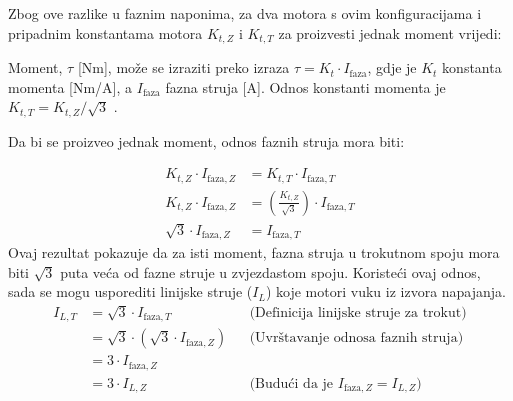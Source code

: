 \documentclass[diplomskirad]{fer}
\begin{document}
Zbog ove razlike u faznim naponima, za dva motora s ovim konfiguracijama i
pripadnim konstantama motora $K_{t, Z}$ i $K_{t, T}$ za proizvesti jednak
moment vrijedi:

Moment, $\tau$ [Nm], može se izraziti preko izraza $\tau = K_t \cdot
	I_{\text{faza}}$, gdje je $K_t$ konstanta momenta [Nm/A], a $I_{\text{faza}}$
fazna struja [A]. Odnos konstanti momenta je $K_{t, T} = K_{t, Z} / \sqrt{3}$
\cite{cite:disertacija}.

Da bi se proizveo jednak moment, odnos faznih struja mora biti:

\begin{align*}
	K_{t,Z} \cdot I_{\text{faza},Z}  & = K_{t,T} \cdot I_{\text{faza},T}                                 \\
	K_{t,Z} \cdot I_{\text{faza},Z}  & = \left( \frac{K_{t,Z}}{\sqrt{3}} \right) \cdot I_{\text{faza},T} \\
	\sqrt{3} \cdot I_{\text{faza},Z} & = I_{\text{faza},T}
\end{align*}
Ovaj rezultat pokazuje da za isti moment, fazna struja u trokutnom spoju mora biti $\sqrt{3}$ puta veća od fazne struje u zvjezdastom spoju.
Koristeći ovaj odnos, sada se mogu usporediti linijske struje ($I_L$) koje motori vuku iz izvora napajanja.
\begin{align*}
	I_{L,T} & = \sqrt{3} \cdot I_{\text{faza},T}                  &  & \text{(Definicija linijske struje za trokut)}              \\
	        & = \sqrt{3} \cdot (\sqrt{3} \cdot I_{\text{faza},Z}) &  & \text{(Uvrštavanje odnosa faznih struja)}                  \\
	        & = 3 \cdot I_{\text{faza},Z}                                                                                         \\
	        & = 3 \cdot I_{L,Z}                                   &  & \text{(Budući da je } I_{\text{faza},Z} = I_{L,Z} \text{)}
\end{align*}
\end{document}
